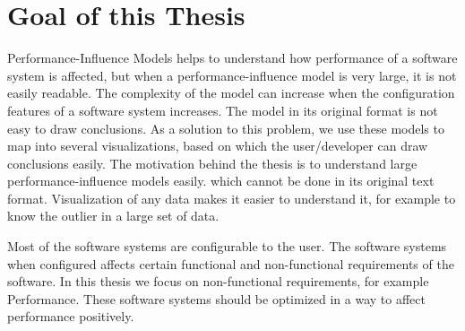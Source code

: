 

\section{Goal of this Thesis}
Performance-Influence Models helps to understand how performance of a software system is affected, but when a performance-influence model is very large, it is not easily readable. The complexity of the model can increase when the configuration features of a software system increases.
The model in its original format is not easy to draw conclusions.
As a solution to this problem, we use these models to map into several visualizations, based on which the user/developer can draw conclusions easily.
The motivation behind the thesis is to understand large performance-influence models easily. which cannot be done in its original text format.
Visualization of any data makes it easier to understand it, for example to know the outlier in a large set of data.

Most of the software systems are configurable to the user. The  software systems when configured affects certain functional and non-functional requirements of the software. In this thesis we focus on non-functional requirements, for example Performance. These software systems should be optimized in a way to affect performance positively.


